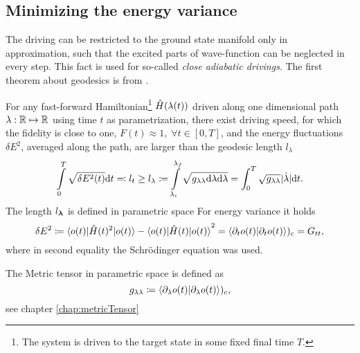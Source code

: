 






\subsection{Minimizing the energy variance}
The driving can be restricted to the ground state manifold only in approximation, such that the excited parts of wave-function can be neglected in every step. This fact is used for so-called \emph{close adiabatic drivings}. The first theorem about geodesics is from \cite{Bukov2019}.

\begin{thm}
    \label{thm:polkovnikov}
    For any fast-forward Hamiltonian\footnote{The system is driven to the target state in some fixed final time $T$.} $\hat{H}(\lambda(t))$ driven along one dimensional path $\lambda: \mathbb{R}\mapsto \mathbb{R}$ using time $t$ as parametrization, there exist driving speed, for which the fidelity is close to one, $F(t)\approx 1, \;\forall t\in[0,T]$, and the energy fluctuations $\delta E^2$, averaged along the path, are larger than the geodesic length $l_\lambda$
    \begin{equation}
        \int\limits_0^{T}\sqrt{\delta E^2(t)}\mathrm{d} t \eqqcolon l_t\geq l_\lambda \coloneqq \int\limits_{\lambda_i}^{\lambda_f} \sqrt{g_{\lambda\lambda}\mathrm{d} \lambda\mathrm{d} \lambda} =\int_0^{T} \sqrt{g_{\lambda\lambda}}|\dot \lambda|\mathrm{d} t.
    \end{equation}
    The length $l_{\bm\lambda}$ is defined in parametric space For energy variance it holds
    \begin{equation}
        \delta E^2\coloneqq \braket{o(t)|\hat{H}(t)^2|o(t)}-\braket{o(t)|\hat{H}(t)|o(t)}^2=\braket{\partial_t  o(t)|\partial_t o(t)})_c=G_{tt},
    \end{equation}    
    where in second equality the Schr\"odinger equation was used. 
    
    The Metric tensor in parametric space is defined as
    \begin{equation}
        g_{\lambda\lambda}\coloneqq \braket{\partial_\lambda o(t)|\partial_\lambda o(t)})_c,
    \end{equation}
    see chapter \ref{chap:metricTensor}
\end{thm}


